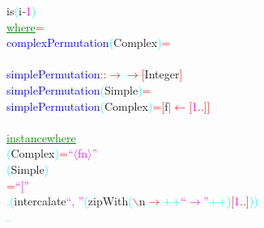 {\rm{}is}\hsspace \textcolor{cyan}{(}{\rm{}i}\textcolor{blue}{{\it{}-}}\textcolor{magenta}{1}\textcolor{cyan}{)}\\\hstab \textcolor{green}{\underline{where}}\hsspace \textcolor{red}{=}\\\textcolor{blue}{complexPermutation}\hsspace \textcolor{cyan}{(}{\rm{}Complex}\textcolor{cyan}{)}\hsspace \textcolor{red}{=}\\\\\textcolor{blue}{simplePermutation}\hsspace \textcolor{red}{::}\hsspace \textcolor{red}{\ensuremath{\rightarrow}}\hsspace \textcolor{red}{\ensuremath{\rightarrow}}\hsspace \textcolor{red}{[}{\rm{}Integer}\textcolor{red}{]}\\\textcolor{blue}{simplePermutation}\hsspace \textcolor{cyan}{(}{\rm{}Simple}\textcolor{cyan}{)}\hsspace \textcolor{red}{=}\\\textcolor{blue}{simplePermutation}\hsspace \textcolor{cyan}{(}{\rm{}Complex}\textcolor{cyan}{)}\hsspace \textcolor{red}{=}\hsspace \textcolor{red}{[}{\rm{}f}\hsspace \textcolor{red}{\ensuremath{|}}\hsspace \textcolor{red}{\ensuremath{\leftarrow}}\hsspace \textcolor{red}{[}\textcolor{magenta}{1}\hsspace \textcolor{red}{..}\textcolor{red}{]}\textcolor{red}{]}\\\\\textcolor{green}{\underline{instance}}\hsspace \textcolor{green}{\underline{where}}\\\hsspace \textcolor{cyan}{(}{\rm{}Complex}\textcolor{cyan}{)}\hsspace \textcolor{red}{=}\hsspace \textcolor{magenta}{``\ensuremath{\langle}fn\ensuremath{\rangle}''}\\\hsspace \textcolor{cyan}{(}{\rm{}Simple}\textcolor{cyan}{)}\\\hstab \hstab \textcolor{red}{=}\hsspace \textcolor{magenta}{``[''}\\\hstab \hstab \textcolor{cyan}{.}\hsspace \textcolor{cyan}{(}{\rm{}intercalate}\hsspace \textcolor{magenta}{``, ''}\hsspace \textcolor{cyan}{(}{\rm{}zipWith}\hsspace \textcolor{cyan}{(}\textcolor{red}{$\backslash$}{\rm{}n}\hsspace \textcolor{red}{\ensuremath{\rightarrow}}\hsspace \textcolor{cyan}{++}\hsspace \textcolor{magenta}{``\ensuremath{\rightarrow}''}\hsspace \textcolor{cyan}{++}\textcolor{cyan}{)}\hsspace \textcolor{red}{[}\textcolor{magenta}{1}\textcolor{red}{..}\textcolor{red}{]}\textcolor{cyan}{)}\textcolor{cyan}{)}\\\hstab \hstab \textcolor{cyan}{.}\hsspace 